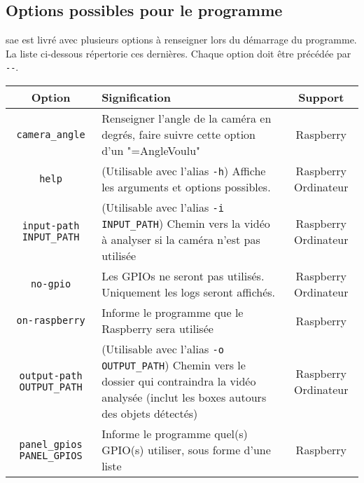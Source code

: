 \subsection{Options possibles pour le programme}
\label{sec:executionOption_clearWay}
\gls{sae} est livré avec plusieurs options à renseigner lors du démarrage du programme. La liste ci-dessous répertorie ces dernières.
Chaque option doit être précédée par \verb=--=.
\begin{table}[H]
    \centering
    \begin{tabularx}{\linewidth}{|c|X|c|}
        \hline
        \rowcolor{tableColorDark} Option      & Signification                                                                                                                                           & Support              \\
        \hline
        \verb=camera_angle=                   & Renseigner l'angle de la caméra en degrés, faire suivre cette option d'un "=AngleVoulu"                                                                 & Raspberry            \\\hline
        \verb=help=                           & (Utilisable avec l'alias \verb=-h=) Affiche les arguments et options possibles.                                                                         & Raspberry Ordinateur \\\hline
        \verb=input-path INPUT_PATH=          & (Utilisable avec l'alias \verb=-i INPUT_PATH=) Chemin vers la vidéo à analyser si la caméra n'est pas utilisée                                          & Raspberry Ordinateur \\\hline
        \verb=no-gpio=                        & Les GPIOs ne seront pas utilisés. Uniquement les logs seront affichés.                                                                                  & Raspberry Ordinateur \\\hline
        \verb=on-raspberry=                   & Informe le programme que le Raspberry sera utilisée                                                                                                     & Raspberry            \\\hline
        \verb=output-path OUTPUT_PATH=        & (Utilisable avec l'alias \verb=-o OUTPUT_PATH=) Chemin vers le dossier qui contraindra la vidéo analysée (inclut les boxes autours des objets détectés) & Raspberry Ordinateur \\\hline
        \verb=panel_gpios PANEL_GPIOS=        & Informe le programme quel(s) GPIO(s) utiliser, sous forme d'une liste                                                                                   & Raspberry            \\\hline

\end{tabularx}
\end{table}
